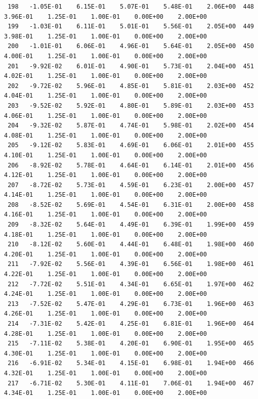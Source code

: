 \documentclass[10pt,letterpaper,notitlepage]{article}
\numberwithin{equation}{section}
\begin{document}
\begin{appendices}
{\begin{verbatim}
 198   -1.05E-01    6.15E-01    5.07E-01    5.48E-01    2.06E+00  448    3.96E-01    1.25E-01    1.00E-01    0.00E+00    2.00E+00
 199   -1.03E-01    6.11E-01    5.01E-01    5.56E-01    2.05E+00  449    3.98E-01    1.25E-01    1.00E-01    0.00E+00    2.00E+00
 200   -1.01E-01    6.06E-01    4.96E-01    5.64E-01    2.05E+00  450    4.00E-01    1.25E-01    1.00E-01    0.00E+00    2.00E+00
 201   -9.92E-02    6.01E-01    4.90E-01    5.73E-01    2.04E+00  451    4.02E-01    1.25E-01    1.00E-01    0.00E+00    2.00E+00
 202   -9.72E-02    5.96E-01    4.85E-01    5.81E-01    2.03E+00  452    4.04E-01    1.25E-01    1.00E-01    0.00E+00    2.00E+00
 203   -9.52E-02    5.92E-01    4.80E-01    5.89E-01    2.03E+00  453    4.06E-01    1.25E-01    1.00E-01    0.00E+00    2.00E+00
 204   -9.32E-02    5.87E-01    4.74E-01    5.98E-01    2.02E+00  454    4.08E-01    1.25E-01    1.00E-01    0.00E+00    2.00E+00
 205   -9.12E-02    5.83E-01    4.69E-01    6.06E-01    2.01E+00  455    4.10E-01    1.25E-01    1.00E-01    0.00E+00    2.00E+00
 206   -8.92E-02    5.78E-01    4.64E-01    6.14E-01    2.01E+00  456    4.12E-01    1.25E-01    1.00E-01    0.00E+00    2.00E+00
 207   -8.72E-02    5.73E-01    4.59E-01    6.23E-01    2.00E+00  457    4.14E-01    1.25E-01    1.00E-01    0.00E+00    2.00E+00
 208   -8.52E-02    5.69E-01    4.54E-01    6.31E-01    2.00E+00  458    4.16E-01    1.25E-01    1.00E-01    0.00E+00    2.00E+00
 209   -8.32E-02    5.64E-01    4.49E-01    6.39E-01    1.99E+00  459    4.18E-01    1.25E-01    1.00E-01    0.00E+00    2.00E+00
 210   -8.12E-02    5.60E-01    4.44E-01    6.48E-01    1.98E+00  460    4.20E-01    1.25E-01    1.00E-01    0.00E+00    2.00E+00
 211   -7.92E-02    5.56E-01    4.39E-01    6.56E-01    1.98E+00  461    4.22E-01    1.25E-01    1.00E-01    0.00E+00    2.00E+00
 212   -7.72E-02    5.51E-01    4.34E-01    6.65E-01    1.97E+00  462    4.24E-01    1.25E-01    1.00E-01    0.00E+00    2.00E+00
 213   -7.52E-02    5.47E-01    4.29E-01    6.73E-01    1.96E+00  463    4.26E-01    1.25E-01    1.00E-01    0.00E+00    2.00E+00
 214   -7.31E-02    5.42E-01    4.25E-01    6.81E-01    1.96E+00  464    4.28E-01    1.25E-01    1.00E-01    0.00E+00    2.00E+00
 215   -7.11E-02    5.38E-01    4.20E-01    6.90E-01    1.95E+00  465    4.30E-01    1.25E-01    1.00E-01    0.00E+00    2.00E+00
 216   -6.91E-02    5.34E-01    4.15E-01    6.98E-01    1.94E+00  466    4.32E-01    1.25E-01    1.00E-01    0.00E+00    2.00E+00
 217   -6.71E-02    5.30E-01    4.11E-01    7.06E-01    1.94E+00  467    4.34E-01    1.25E-01    1.00E-01    0.00E+00    2.00E+00

\end{verbatim}}
\end{appendices}
\end{document}
